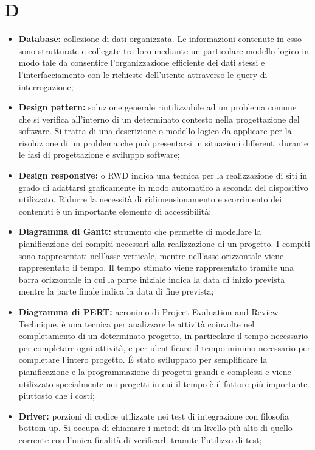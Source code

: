 \section*{D} %
\label{sec:d}
	\begin{itemize}
		\item \textbf{Database:} collezione di dati organizzata. Le informazioni contenute in esso sono strutturate e collegate tra loro mediante un particolare modello logico in modo tale da consentire l'organizzazione efficiente dei dati stessi e l'interfacciamento con le richieste dell'utente attraverso le query di interrogazione;
		\item \textbf{Design pattern:} soluzione generale riutilizzabile ad un problema comune che si verifica all'interno di un determinato contesto nella progettazione del software. Si tratta di una descrizione o modello logico da applicare per la risoluzione di un problema che può presentarsi in situazioni differenti durante le fasi di progettazione e sviluppo software;
		\item \textbf{Design responsive:} o RWD indica una tecnica per la realizzazione di siti in grado di adattarsi graficamente in modo automatico a seconda del dispositivo utilizzato. Ridurre la necessità di ridimensionamento e scorrimento dei contenuti è un importante elemento di accessibilità;
		\item \textbf{Diagramma di Gantt:} strumento che permette di modellare la pianificazione dei compiti necessari alla realizzazione di un progetto. I compiti sono rappresentati nell'asse verticale, mentre nell'asse orizzontale viene rappresentato il tempo. Il tempo stimato viene rappresentato tramite una barra orizzontale in cui la parte iniziale indica la data di inizio prevista mentre la parte finale indica la data di fine prevista;
		\item \textbf{Diagramma di PERT:} acronimo di Project Evaluation and Review Technique, è una tecnica per analizzare le attività coinvolte nel completamento di un determinato progetto, in particolare il tempo necessario per completare ogni attività, e per identificare il tempo minimo necessario per completare l'intero progetto. É stato sviluppato per semplificare la pianificazione e la programmazione di progetti grandi e complessi e viene utilizzato specialmente nei progetti in cui il tempo è il fattore più importante piuttosto che i costi;
		\item \textbf{Driver:} porzioni di codice utilizzate nei test di integrazione con filosofia bottom-up. Si occupa di chiamare i metodi di un livello più alto di quello corrente con l'unica finalità di verificarli tramite l'utilizzo di test;
	\end{itemize}
\pagebreak

